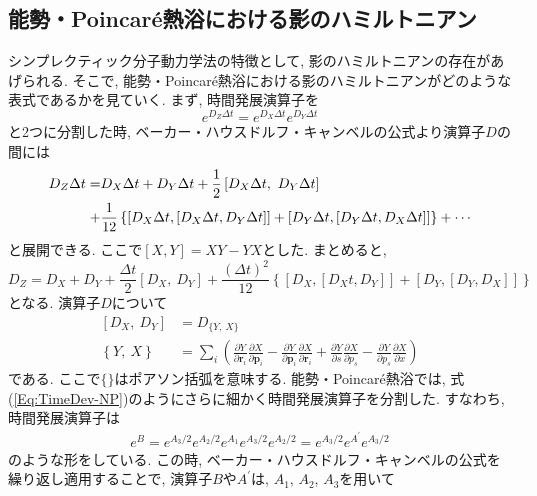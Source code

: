 \subsection{能勢・Poincar\'{e}熱浴における影のハミルトニアン}
シンプレクティック分子動力学法の特徴として, 影のハミルトニアンの存在があげられる.
そこで, 能勢・Poincar\'{e}熱浴における影のハミルトニアンがどのような表式であるかを見ていく. まず, 時間発展演算子を
\begin{equation}
  e^{D_{Z} \Delta t}
  =
  e^{D_{X} \Delta t}
  e^{D_{Y} \Delta t}
\end{equation}
と2つに分割した時, ベーカー・ハウスドルフ・キャンベルの公式より演算子$D$の間には
\begin{align}
  D_{Z} \Delta t
  =&
  D_{X} \Delta t + D_{Y} \Delta t
  +
  \frac{1}{2}
  \left[D_{X}\Delta t,~ D_{Y}\Delta t\right]
  \notag \\
  +&
  \frac{1}{12}
  \left\{
    \left[D_{X}\Delta t, \left[D_{X}\Delta t, D_{Y}\Delta t\right]  \right]
    +
    \left[D_{Y}\Delta t, \left[D_{Y}\Delta t, D_{X}\Delta t\right]\right]
  \right\}
  +\cdots
\end{align}
と展開できる. ここで$[X, Y]= XY- YX$とした. まとめると,
\begin{equation}
  D_{Z}
  =
  D_{X} + D_{Y}
  +
  \frac{\Delta t}{2}
  \left[D_{X},~ D_{Y}\right]
  +
  \frac{(\Delta t)^{2}}{12}
  \left\{
    \left[D_{X}, \left[D_{X}t, D_{Y}\right] \right]
    +
    \left[D_{Y}, \left[D_{Y}, D_{X}\right]\right]
  \right\}
\end{equation}
となる.
演算子$D$について
\begin{align}
  \left[D_{X},~ D_{Y}\right] &= D_{\{Y,~ X\}}
  \\
  \left\{Y,~ X\right\} &=
  \sum_{i}
  \left(
    \frac{\partial Y}{\partial \bm{r}_{i}}
    \frac{\partial X}{\partial \bm{p}_{i}}
    -
    \frac{\partial Y}{\partial \bm{p}_{i}}
    \frac{\partial X}{\partial \bm{r}_{i}}
    +
    \frac{\partial Y}{\partial s}
    \frac{\partial X}{\partial p_{s}}
    -
    \frac{\partial Y}{\partial p_{s}}
    \frac{\partial X}{\partial x}
  \right)
\end{align}
である. ここで$\{\}$はポアソン括弧を意味する.
能勢・Poincar\'{e}熱浴では, 式(\ref{Eq:TimeDev-NP})のようにさらに細かく時間発展演算子を分割した. 
すなわち, 時間発展演算子は
\begin{align}
  e^{B} = 
  e^{A_{3}/2} e^{A_{2}/2}
  e^{A_{1}}
  e^{A_{3}/2} e^{A_{2}/2}
  =
  e^{A_{3}/2} e^{A^{\prime}} e^{A_{3}/2}
\end{align}
のような形をしている. この時, ベーカー・ハウスドルフ・キャンベルの公式を繰り返し適用することで, 演算子$B$や$A^{\prime}$は, $A_1$, $A_2$, $A_{3}$を用いて

